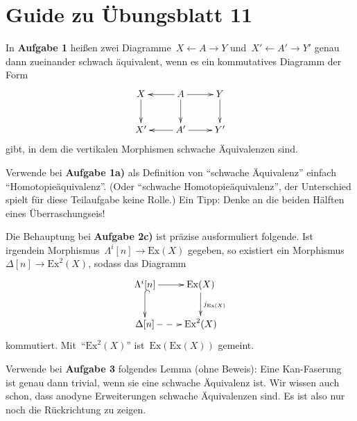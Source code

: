 \documentclass{uebblatt}
\begin{document}
\section*{Guide zu Übungsblatt 11}

In \textbf{Aufgabe 1} heißen zwei Diagramme~$X \leftarrow A \rightarrow Y$
und~$X' \leftarrow A' \rightarrow Y'$ genau dann zueinander schwach äquivalent,
wenn es ein kommutatives Diagramm der Form
\[ \xymatrix{
  X \ar[d] & A \ar[l]\ar[r] \ar[d] & Y \ar[d] \\
  X' & A' \ar[l]\ar[r] & Y'
} \]
gibt, in dem die vertikalen Morphismen schwache Äquivalenzen sind.

Verwende bei \textbf{Aufgabe 1a)} als Definition von "`schwache Äquivalenz"'
einfach "`Homotopieäquivalenz"'. (Oder "`schwache Homotopieäquivalenz"', der
Unterschied spielt für diese Teilaufgabe keine Rolle.) Ein Tipp: Denke an die
beiden Hälften eines Überraschungseis!

Die Behauptung bei \textbf{Aufgabe 2c)} ist präzise ausformuliert folgende. Ist
irgendein Morphismus~$\Lambda^i[n] \to \mathrm{Ex}(X)$ gegeben, so existiert
ein Morphismus~$\Delta[n] \to \mathrm{Ex}^2(X)$, sodass das Diagramm
\[ \xymatrix{
  \Lambda^i[n] \ar[r] \ar@{^{(}->}[d] & \mathrm{Ex}(X) \ar[d]^{j_{\mathrm{Ex}(X)}} \\
  \Delta[n] \ar@{-->}[r] & \mathrm{Ex}^2(X)
} \]
kommutiert. Mit~"`$\mathrm{Ex}^2(X)$"' ist~$\mathrm{Ex}(\mathrm{Ex}(X))$ gemeint.

Verwende bei \textbf{Aufgabe 3} folgendes Lemma (ohne Beweis): Eine
Kan-Faserung ist genau dann trivial, wenn sie eine schwache Äquivalenz ist.
Wir wissen auch schon, dass anodyne Erweiterungen schwache Äquivalenzen sind.
Es ist also nur noch die Rückrichtung zu zeigen.
\end{document}
